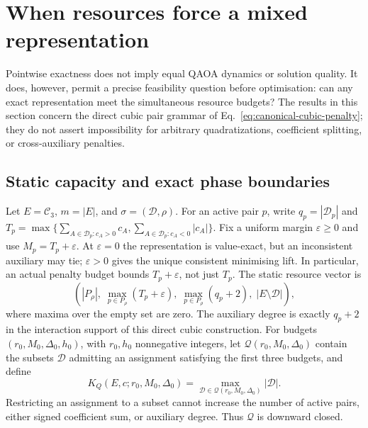 \section{When resources force a mixed representation}
\label{sec:representation-phases}

Pointwise exactness does not imply equal QAOA dynamics or solution quality.
It does, however, permit a precise feasibility question before optimisation:
can any exact representation meet the simultaneous resource budgets?
The results in this section concern the direct cubic pair grammar of
Eq.~\eqref{eq:canonical-cubic-penalty}; they do not assert impossibility for
arbitrary quadratizations, coefficient splitting, or cross-auxiliary penalties.

\subsection{Static capacity and exact phase boundaries}
Let $E=\mathcal C_3$, $m=|E|$, and $\sigma=(\mathcal D,\rho)$.
For an active pair $p$, write $q_p=|\mathcal D_p|$ and
$T_p=\max\{\sum_{A\in\mathcal D_p:c_A>0}c_A,
\sum_{A\in\mathcal D_p:c_A<0}|c_A|\}$.
Fix a uniform margin $\varepsilon\geq0$ and use
$M_p=T_p+\varepsilon$. At $\varepsilon=0$ the representation is value-exact,
but an inconsistent auxiliary may tie; $\varepsilon>0$ gives the unique
consistent minimising lift. In particular, an actual penalty budget bounds
$T_p+\varepsilon$, not just $T_p$.
The static resource vector is
\[
 \left(|P_\rho|,\;\max_{p\in P_\rho}(T_p+\varepsilon),\;
 \max_{p\in P_\rho}(q_p+2),\;|E\setminus\mathcal D|\right),
\]
where maxima over the empty set are zero. The auxiliary degree is exactly
$q_p+2$ in the interaction support of this direct cubic construction.
For budgets $(r_0,M_0,\Delta_0,h_0)$, with $r_0,h_0$ nonnegative integers,
let $\mathcal Q(r_0,M_0,\Delta_0)$ contain the subsets $\mathcal D$
admitting an assignment satisfying the first three budgets, and define
\begin{equation}
 K_Q(E,c;r_0,M_0,\Delta_0)
 =\max_{\mathcal D\in\mathcal Q(r_0,M_0,\Delta_0)}|\mathcal D|.
 \label{eq:static-reduction-capacity}
\end{equation}
Restricting an assignment to a subset cannot increase the number of active
pairs, either signed coefficient sum, or auxiliary degree. Thus
$\mathcal Q$ is downward closed.

